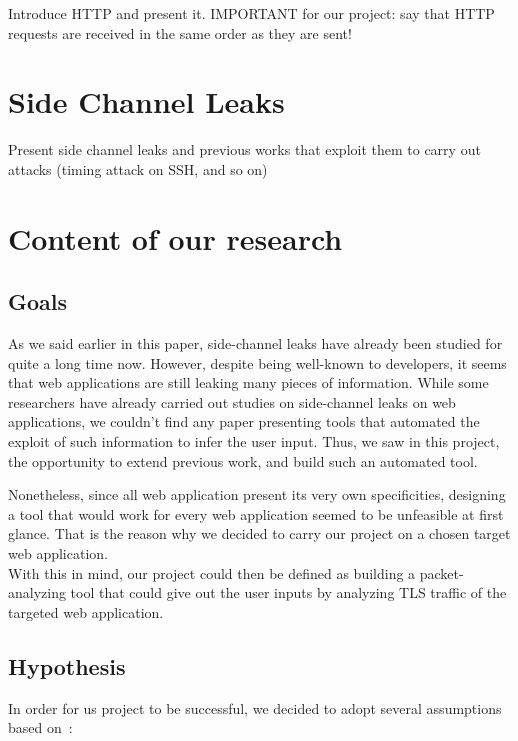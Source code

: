 \documentclass[runningheads]{llncs}
\begin{document}
Introduce HTTP and present it.
IMPORTANT for our project: say that HTTP requests are received in the same order as they are sent!

\section{Side Channel Leaks}

Present side channel leaks and previous works that exploit them to carry out attacks (timing attack on SSH, and so on)

\section{Content of our research}

\subsection{Goals}

As we said earlier in this paper, side-channel leaks have already been studied for quite a long time now. However, despite being well-known to developers, it seems that web applications are still leaking many pieces of information. While some researchers have already carried out studies on side-channel leaks on web applications, we couldn't find any paper presenting tools that automated the exploit of such information to infer the user input. Thus, we saw in this project, the opportunity to extend previous work, and build such an automated tool.

\medskip

Nonetheless, since all web application present its very own specificities, designing a tool that would work for every web application seemed to be unfeasible at first glance. That is the reason why we decided to carry our project on a chosen target web application. \\

With this in mind, our project could then be defined as building a packet-analyzing tool that could give out the user inputs by analyzing TLS traffic of the targeted web application.

\subsection{Hypothesis}

In order for us project to be successful, we decided to adopt several assumptions based on~\cite{DBLP:conf/sp/ChenWWZ10}:
\end{document}
